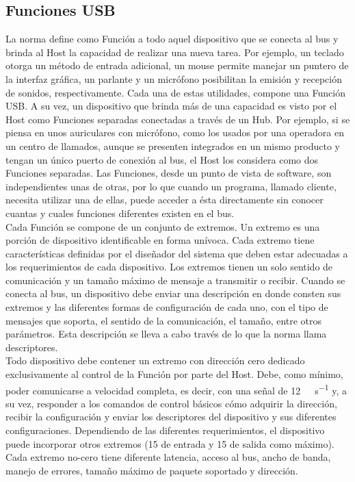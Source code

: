 \subsection{Funciones USB}
	La norma define como Función a todo aquel dispositivo que se conecta al bus y brinda al Host la capacidad de realizar una nueva tarea. Por ejemplo, un teclado otorga un método de entrada adicional, un mouse permite manejar un puntero de la interfaz gráfica, un parlante y un micrófono posibilitan la emisión y recepción de sonidos, respectivamente. Cada una de estas utilidades, compone una Función USB. A su vez, un dispositivo que brinda más de una capacidad es visto por el Host como Funciones separadas conectadas a través de un Hub. Por ejemplo, si se piensa en unos auriculares con micrófono, como los usados por una operadora en un centro de llamados, aunque se presenten integrados en un mismo producto y tengan un único puerto de conexión al bus, el Host los considera como dos Funciones separadas. Las Funciones, desde un punto de vista de software, son independientes unas de otras, por lo que cuando un programa, llamado cliente, necesita utilizar una de ellas, puede acceder a ésta directamente sin conocer cuantas y cuales funciones diferentes existen en el bus.\\
	
	Cada Función se compone de un conjunto de extremos. Un extremo es una porción de dispositivo identificable en forma unívoca\cite{USBspec}. Cada extremo tiene características definidas por el diseñador del sistema que deben estar adecuadas a los requerimientos de cada dispositivo. Los extremos tienen un solo sentido de comunicación y un tamaño máximo de mensaje a transmitir o recibir. Cuando se conecta al bus, un dispositivo debe enviar una descripción en donde consten sus extremos y las diferentes formas de configuración de cada uno, con el tipo de mensajes que soporta, el sentido de la comunicación, el tamaño, entre otros parámetros. Esta descripción se lleva a cabo través de lo que la norma llama descriptores.\\
	
	Todo dispositivo debe contener un extremo con dirección cero dedicado exclusivamente al control de la Función por parte del Host. Debe, como mínimo, poder comunicarse a velocidad completa, es decir, con una señal de \SI{12}{\mega\bit\per\second} y, a su vez, responder a los comandos de control básicos cómo adquirir la dirección, recibir la configuración y enviar los descriptores del dispositivo y sus diferentes configuraciones. Dependiendo de las diferentes requerimientos, el dispositivo puede incorporar otros extremos (15 de entrada y 15 de salida como máximo). Cada extremo no-cero tiene diferente latencia, acceso al bus, ancho de banda, manejo de errores, tamaño máximo de paquete soportado y dirección.\\
	
